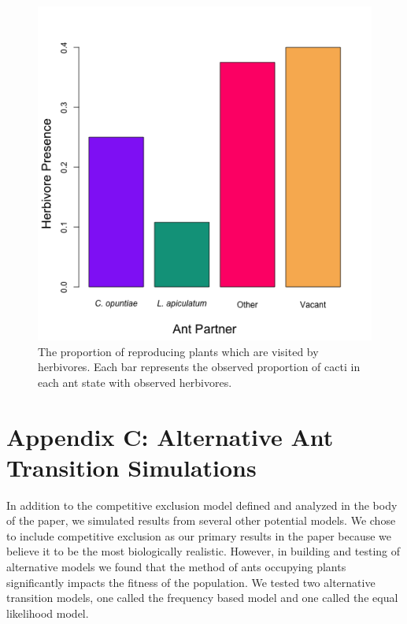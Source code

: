 \documentclass[11pt]{article}
\begin{document}
\begin{figure}[H]
	\includegraphics[width=0.7\linewidth]{Figures/herb_all.png}
	\caption{The proportion of reproducing plants which are visited by herbivores.
	Each bar represents the observed proportion of cacti in each ant state with observed herbivores.}
	\label{app:herb}
\end{figure}



\section*{Appendix C: Alternative Ant Transition Simulations}\label{appendix:C}
\renewcommand{\thefigure}{C\arabic{figure}}

In addition to the competitive exclusion model defined and analyzed in the body of the paper, we simulated results from several other potential models. 
We chose to include competitive exclusion as our primary results in the paper because we believe it to be the most biologically realistic.
However, in building and testing of alternative models we found that the method of ants occupying plants significantly impacts the fitness of the population. 
We tested two alternative transition models, one called the frequency based model and one called the equal likelihood model. 
\end{document}
